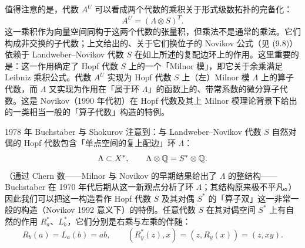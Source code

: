 值得注意的是，代数 $A^U$ 可以看成两个代数的乘积关于形式级数拓扑的完备化：
\[
A^U=(\Lambda\otimes S)^T.
\]
这一乘积作为向量空间同构于这两个代数的张量积，但乘法不是通常的乘法。它们构成非交换的子代数；上文给出的、关于它们换位子的 Novikov 公式（见 (9.8)）依赖于 Landweber--Novikov 代数 $S$ 在如上所述的复配边环上的作用。这里重要的是：这一作用确定了 Hopf 代数 $S$ 上的一个「Milnor 模」，即它关于余乘满足 Leibniz 乘积公式。代数 $A^U$ 实现为 Hopf 代数 $S$ 上（左）Milnor 模 $\Lambda$ 上的算子代数，而 $\Lambda$ 又实现为作用在「属于环 $\Lambda$」的函数上的、带常系数的微分算子代数。这是 Novikov（1990 年代初）在 Hopf 代数及其上 Milnor 模理论背景下给出的一类相当一般的「算子代数」构造的特例。

1978 年 Buchstaber 与 Shokurov 注意到：与 Landweber--Novikov 代数 $S$ 自然对偶的 Hopf 代数包含「单点空间的复上配边」环 $\Lambda$：
\[
\Lambda\subset X^*,\qquad \Lambda\otimes\mathbb{Q}=S^*\otimes\mathbb{Q}.
\]
（通过 Chern 数——Milnor 与 Novikov 的早期结果给出了 $\Lambda$ 的整结构——Buchstaber 在 1970 年代后期从这一新观点分析了环 $\Lambda$；其结构原来极不平凡。）因此我们可以把这一构造看作 Hopf 代数 $S$ 及其对偶 $S^*$ 的「算子双」这一非常一般的构造（Novikov 1992 意义下）的特例。任意代数 $S$ 在其对偶空间 $S^*$ 上有自然的作用 $R_a^*$、$L_b^*$，它们分别是右乘与左乘的伴随：
\[
R_b(a)=L_a(b)=ab,\qquad (R_y^*(z),x)=(z,R_y(x))=(z,xy).
\]

